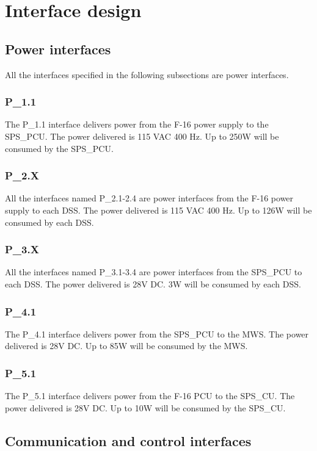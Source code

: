 \documentclass[Main]{subfiles}
\begin{document}
\section{Interface design}

\subsection{Power interfaces}
All the interfaces specified in the following subsections are power interfaces.

\subsubsection{P\_1.1}
The P\_1.1 interface delivers power from the F-16 power supply to the SPS\_PCU. The power delivered is 115 VAC 400 Hz. Up to 250W will be consumed by the SPS\_PCU.

\subsubsection{P\_2.X}
All the interfaces named P\_2.1-2.4 are power interfaces from the F-16 power supply to each DSS. The power delivered is 115 VAC 400 Hz. Up to 126W will be consumed by each DSS.

\subsubsection{P\_3.X}
All the interfaces named P\_3.1-3.4 are power interfaces from the SPS\_PCU to each DSS. The power delivered is 28V DC. 3W will be consumed by each DSS.

\subsubsection{P\_4.1}
The P\_4.1 interface delivers power from the SPS\_PCU to the MWS. The power delivered is 28V DC. Up to 85W will be consumed by the MWS.

\subsubsection{P\_5.1}
The P\_5.1 interface delivers power from the F-16 PCU to the SPS\_CU. The power delivered is 28V DC. Up to 10W will be consumed by the SPS\_CU.


\subsection{Communication and control interfaces}
\end{document}

